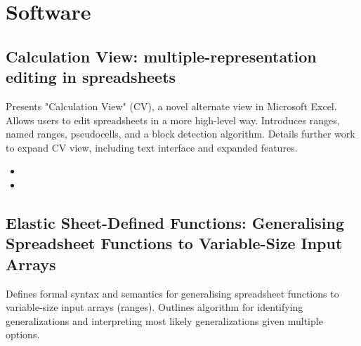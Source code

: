 \chapter {Software}

\section {Calculation View: multiple-representation editing in spreadsheets
\cite{sarkar2018calculation}}
Presents "Calculation View" (CV), a novel alternate view in Microsoft Excel.
Allows users to edit spreadsheets in a more high-level way. Introduces ranges,
named ranges, pseudocells, and a block detection algorithm. Details further work
to expand CV view, including text interface and expanded features.
\begin{itemize}
    \item {}
    \item {}
\end{itemize}

\section {Elastic Sheet-Defined Functions: Generalising Spreadsheet Functions to
Variable-Size Input Arrays \cite{elastic-sheet-defined-functions-generalising-spreadsheet-functions-to-variable-size-input-arrays}}
Defines formal syntax and semantics for generalising spreadsheet functions to
variable-size input arrays (ranges). Outlines algorithm for identifying
generalizations and interpreting most likely generalizations given multiple
options.